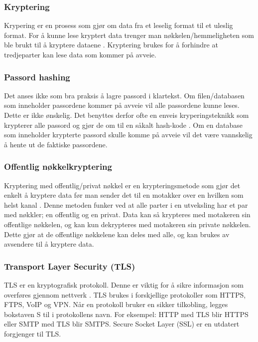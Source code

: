  \subsubsection{Kryptering}
 \label{sec:analysis-security-encryption}
 Krypering er en prosess som gjør om data fra et leselig format til et uleslig format. For å kunne lese kryptert data trenger man nøkkelen/hemmeligheten som ble brukt til å kryptere dataene \cite[s.~117-118]{NattTomHeine2015Datasikkerhet}. Kryptering brukes for å forhindre at tredjeparter kan lese data som kommer på avveie.
 
 \subsubsection{Passord hashing}
 \label{sec:analysis-security-password-hashing}
 Det anses ikke som bra praksis å lagre passord i klartekst. Om filen/databasen som inneholder passordene kommer på avveie vil alle passordene kunne leses. Dette er ikke ønskelig. Det benyttes derfor ofte en enveis kryperingsteknikk som krypterer alle passord og gjør de om til en såkalt hash-kode \cite[s.~100-103]{NattTomHeine2015Datasikkerhet}. Om en database som inneholder krypterte passord skulle komme på avveie vil det være vannskelig å hente ut de faktiske passordene.
 
 \subsubsection{Offentlig nøkkelkryptering}
 \label{sec:analysis-security-public_key-cryptography}
 Kryptering med offentlig/privat nøkkel er en krypteringsmetode som gjør det enkelt å kryptere data før man sender det til en motakker over en hvilken som helst kanal \cite[s.~58-60]{NattTomHeine2015Datasikkerhet}. Denne metoden funker ved at alle parter i en utveksling har et par med nøkkler; en offentlig og en privat. Data kan så krypteres med motakeren sin offentlige nøkkelen, og kan kun dekrypteres med motakeren sin private nøkkelen. Dette gjør at de offentlige nøkkelene kan deles med alle, og kan brukes av avsendere til å kryptere data.
 
\subsubsection{Transport Layer Security (TLS)}
\label{sec:analysis-security-tls}
TLS er en kryptografisk protokoll. Denne er viktig for å sikre informasjon som overføres gjennom nettverk \cite{thomas2000ssl}. TLS brukes i forskjellige protokoller som HTTPS, FTPS, VoIP og VPN.
Når en protokoll bruker en sikker tilkobling, legges bokstaven S til i protokollens navn. For eksempel: HTTP med TLS blir HTTPS eller SMTP med TLS blir SMTPS.
Secure Socket Layer (SSL) er en utdatert forgjenger til TLS.
 
